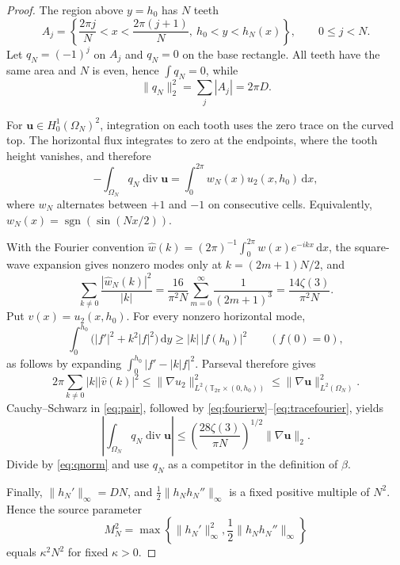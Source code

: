 \documentclass[11pt]{article}
\newcommand{\Om}{\Omega}
\newcommand{\T}{\mathbb T}
\newcommand{\dd}{\,\mathrm d}
\begin{document}
\begin{proof}
The region above \(y=h_0\) has \(N\) teeth
\[
 A_j=\left\{\frac{2\pi j}{N}<x<\frac{2\pi(j+1)}N,
 \ h_0<y<h_N(x)\right\},\qquad 0\le j<N.
\]
Let \(q_N=(-1)^j\) on \(A_j\) and \(q_N=0\) on the base rectangle.
All teeth have the same area and \(N\) is even, hence \(\int q_N=0\),
while
\begin{equation}\label{eq:qnorm}
 \|q_N\|_2^2=\sum_j|A_j|=2\pi D.
\end{equation}

For \(\mathbf u\in H^1_0(\Om_N)^2\), integration on each tooth uses
the zero trace on the curved top.  The horizontal flux integrates to zero at
the endpoints, where the tooth height vanishes, and therefore
\begin{equation}\label{eq:pair}
 -\int_{\Om_N}q_N\operatorname{div}\mathbf u
 =\int_0^{2\pi}w_N(x)u_2(x,h_0)\dd x,
\end{equation}
where \(w_N\) alternates between \(+1\) and \(-1\) on consecutive
cells.  Equivalently, \(w_N(x)=\operatorname{sgn}(\sin(Nx/2))\).

With the Fourier convention
\(\widehat w(k)=(2\pi)^{-1}\int_0^{2\pi}w(x)e^{-ikx}\dd x\), the
square-wave expansion gives nonzero modes only at
\(k=(2m+1)N/2\), and
\begin{equation}\label{eq:fourierw}
 \sum_{k\ne0}\frac{|\widehat w_N(k)|^2}{|k|}
 =\frac{16}{\pi^2N}\sum_{m=0}^\infty\frac1{(2m+1)^3}
 =\frac{14\zeta(3)}{\pi^2N}.
\end{equation}
Put \(v(x)=u_2(x,h_0)\).  For every nonzero horizontal mode,
\[
 \int_0^{h_0}\big(|f'|^2+k^2|f|^2\big)\dd y
 \ge |k|\,|f(h_0)|^2\qquad(f(0)=0),
\]
as follows by expanding \(\int_0^{h_0}|f'-|k|f|^2\).  Parseval
therefore gives
\begin{equation}\label{eq:tracefourier}
 2\pi\sum_{k\ne0}|k||\widehat v(k)|^2
 \le\|\nabla u_2\|_{L^2(\T_{2\pi}\times(0,h_0))}^2
 \le\|\nabla\mathbf u\|_{L^2(\Om_N)}^2.
\end{equation}
Cauchy--Schwarz in \eqref{eq:pair}, followed by
\eqref{eq:fourierw}--\eqref{eq:tracefourier}, yields
\[
 \left|\int_{\Om_N}q_N\operatorname{div}\mathbf u\right|
 \le\left(\frac{28\zeta(3)}{\pi N}\right)^{1/2}
 \|\nabla\mathbf u\|_2.
\]
Divide by \eqref{eq:qnorm} and use \(q_N\) as a competitor in the
definition of \(\beta\).

Finally, \(\|h_N'\|_\infty=DN\), and
\(\frac12\|h_Nh_N''\|_\infty\) is a fixed positive multiple of
\(N^2\).  Hence the source parameter
\[
 M_N^2=\max\left\{\|h_N'\|_\infty^2,
 \frac12\|h_Nh_N''\|_\infty\right\}
\]
equals \(\kappa^2N^2\) for fixed \(\kappa>0\).
\end{proof}
\end{document}
